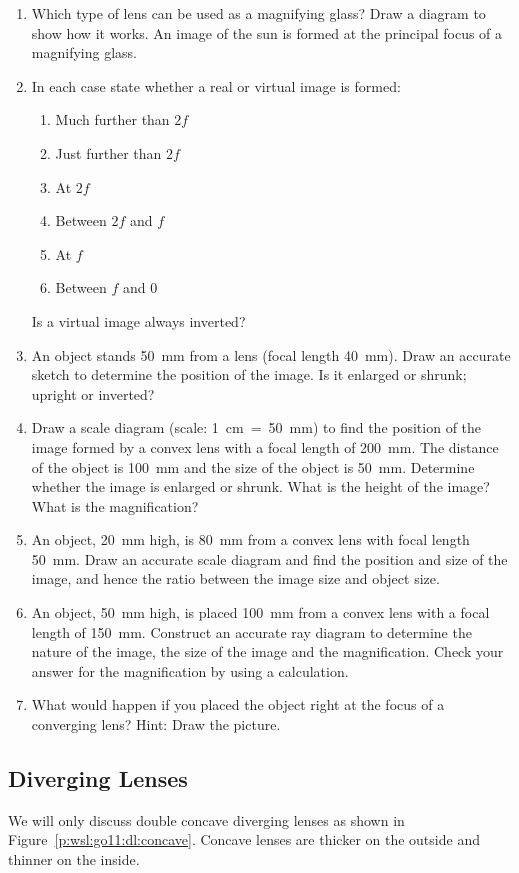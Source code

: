 {
\begin{enumerate}
\item Which type of lens can be used as a magnifying glass? Draw a diagram to show how it works. An image of the sun is formed at the principal focus of a magnifying glass.
\item In each case state whether a real or virtual image is formed:
\begin{enumerate}
\item Much further than $2f$
\item Just further than $2f$
\item At $2f$
\item Between $2f$ and $f$
\item At $f$
\item Between $f$ and 0
\end{enumerate}
Is a virtual image always inverted?
\item An object stands 50~mm from a lens (focal length 40~mm). Draw an accurate sketch to determine the position of the image. Is it enlarged or shrunk; upright or inverted?
\item Draw a scale diagram (scale: 1~cm~=~50~mm) to find the position of the image formed by a convex lens with a focal length of 200~mm. The distance of the object is 100~mm and the size of the object is 50~mm. Determine whether the image is enlarged or shrunk. What is the height of the image? What is the magnification?
\item An object, 20~mm high, is 80~mm from a convex lens with focal length 50~mm. Draw an accurate scale diagram and find the position and size of the image, and hence the ratio between the image size and object size.
\item An object, 50~mm high, is placed 100~mm from a convex lens with a focal length of 150~mm. Construct an accurate ray diagram to determine the nature of the image, the size of the image and the magnification. Check your answer for the magnification by using a calculation.
\item What would happen if you placed the object right at the focus of a converging lens? Hint: Draw the picture.
\end{enumerate}
}

\subsection{Diverging Lenses}
We will only discuss double concave diverging lenses as shown in Figure~\ref{p:wsl:go11:dl:concave}. Concave lenses are thicker on the outside and thinner on the inside.

